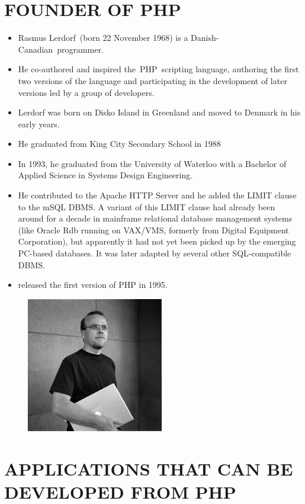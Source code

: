 \documentclass{article}
\begin{document}
\section*{FOUNDER OF PHP}
\begin{itemize}
	\item Rasmus Lerdorf (born 22 November 1968) is a Danish-Canadian programmer. 
	\item He co-authored and inspired the PHP scripting language, authoring the first two versions of the language and participating in the development of later versions led by a group of developers.
	\item Lerdorf was born on Disko Island in Greenland and moved to Denmark in his early years. 
	\item He graduated from King City Secondary School in 1988 
	\item In 1993, he graduated from the University of Waterloo with a Bachelor of Applied Science in Systems Design Engineering. 
	\item He contributed to the Apache HTTP Server and he added the LIMIT clause to the mSQL DBMS. A variant of this LIMIT clause had already been around for a decade in mainframe relational database management systems (like Oracle Rdb running on VAX/VMS, formerly from Digital Equipment Corporation), but apparently it had not yet been picked up by the emerging PC-based databases. It was later adapted by several other SQL-compatible DBMS. 
	\item  released the first version of PHP in 1995.
\end{itemize}
\begin{figure}
		\begin{center}
	\includegraphics[width=0.4\linewidth]{rasmus.jpg}
\end{center}
\end{figure}
\newpage
\section*{APPLICATIONS THAT CAN BE DEVELOPED FROM PHP}
\end{document}
